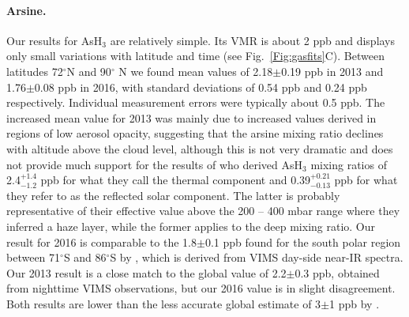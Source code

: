 \documentclass[article,11pt]{emulateapj}
\def\asht{AsH$_3$ }
\def\deg{$^\circ$ }
\def\degx{$^\circ$}
\begin{document}
\paragraph{Arsine. } Our results for \asht are relatively simple.
  Its VMR is about 2 ppb and displays only small variations with latitude
  and time (see
  Fig.\ \ref{Fig:gasfits}C).  Between latitudes 72\degx N and 90\deg N
  we found mean values of 2.18$\pm$0.19 ppb in 2013 and 1.76$\pm$0.08
  ppb in 2016, with standard deviations of 0.54 ppb and 0.24 ppb
  respectively. Individual measurement errors were typically about 0.5
  ppb.  The increased mean value for 2013 was mainly due to increased
  values derived in regions of low aerosol opacity, suggesting that
  the arsine mixing ratio declines with altitude above the cloud
  level, although this is not very dramatic and does not provide much
  support for the results of \cite{Bezard1989} who derived \asht mixing
  ratios of 2.4$^{+1.4}_{-1.2}$ ppb for what they
  call the thermal component and 0.39$^{+0.21}_{-0.13}$ ppb for what
  they refer to as the reflected solar component. The latter is
  probably representative of their effective value above the 200 -- 400
  mbar range where they inferred a haze layer, while the former
  applies to the deep mixing ratio.  Our result for 2016 is comparable
  to the 1.8$\pm$0.1 ppb found for the south polar region between
  71\degx S and 86\degx S by \cite{Sro2020spole}, which is derived
  from VIMS day-side near-IR spectra.  Our 2013 result is a
  close match to the \cite{Fletcher2011vims} global value of
  2.2$\pm$0.3 ppb, obtained from nighttime VIMS observations, but our
  2016 value is in slight disagreement. Both results are lower than the
  less accurate global estimate of 3$\pm$1 ppb by \cite{Noll1990}.

\end{document}
